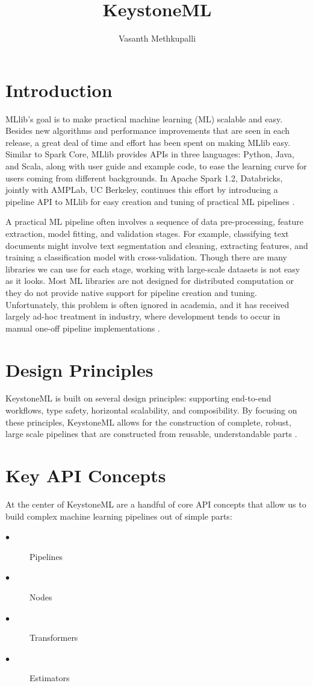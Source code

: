 \documentclass[9pt,twocolumn,twoside]{styles/osajnl}
\title{KeystoneML}
\author[1,*]{Vasanth Methkupalli}
\affil[1]{School of Informatics and Computing, Bloomington, IN 47408, U.S.A.}
\affil[*]{Corresponding authors: mvasanthiiit@gmail.com}
\begin{document}
\maketitle

\section{Introduction}

MLlib’s goal is to make practical machine learning (ML) scalable and
easy. Besides new algorithms and performance improvements that are
seen in each release, a great deal of time and effort has been spent
on making MLlib easy. Similar to Spark Core, MLlib provides APIs in
three languages: Python, Java, and Scala, along with user guide and
example code, to ease the learning curve for users coming from
different backgrounds. In Apache Spark 1.2, Databricks, jointly with
AMPLab, UC Berkeley, continues this effort by introducing a pipeline
API to MLlib for easy creation and tuning of practical ML
pipelines \cite{meng2016mllib} .

A practical ML pipeline often involves a sequence of data
pre-processing, feature extraction, model fitting, and validation
stages. For example, classifying text documents might involve text
segmentation and cleaning, extracting features, and training a
classification model with cross-validation. Though there are many
libraries we can use for each stage, working with large-scale datasets
is not easy as it looks. Most ML libraries are not designed for
distributed computation or they do not provide native support for
pipeline creation and tuning. Unfortunately, this problem is often
ignored in academia, and it has received largely ad-hoc treatment in
industry, where development tends to occur in manual one-off pipeline
implementations \cite{meng2016mllib} .

\section{Design Principles}

KeystoneML is built on several design principles: supporting
end-to-end workflows, type safety, horizontal scalability, and
composibility. By focusing on these principles, KeystoneML allows for the
construction of complete, robust, large scale pipelines that are
constructed from reusable, understandable parts \cite{www-keystoneml1} .

\section{Key API Concepts}
At the center of KeystoneML are a handful of core API concepts that
allow us to build complex machine learning pipelines out of simple
parts:
\begin{description}

\item[$\bullet$] Pipelines
\item[$\bullet$] Nodes
\item[$\bullet$] Transformers
\item[$\bullet$] Estimators
  
 
\end{description}
\end{document}
